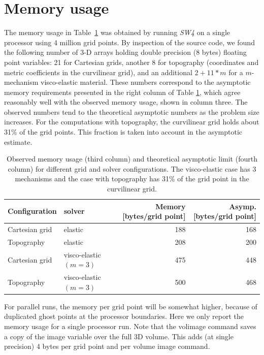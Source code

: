 \documentclass[11pt]{report}
\begin{document}
\section{Memory usage}

The memory usage in Table~\ref{tab:mem-usage} was obtained by running \emph{SW4} on a single processor
using 4 million grid points. By inspection of the source code, we found the following number of 3-D
arrays holding double precision (8 bytes) floating point variables:
21 for Cartesian grids, another
8 for topography (coordinates and metric coefficients in the curvilinear grid), and an additional
$2+11*m$ for a $m$-mechanism visco-elastic material. These numbers correspond to the asymptotic memory
 requirements presented in the right column of Table \ref{tab:mem-usage}, which agree reasonably well with the
 observed memory usage, shown in column three. The observed numbers tend to the theoretical asymptotic 
numbers as the problem size increases. For the computations with topography, the curvilinear grid holds about 31\%
of the grid points. This fraction is taken into account in the asymptotic estimate.
 \begin{table}
 \begin{center}
 \begin{tabular}{|l|l|r|r|}\hline
 Configuration   &  solver       & Memory [bytes/grid point]  & Asymp. [bytes/grid point] \\ \hline\hline
 Cartesian grid  & elastic       & 188   & 168       \\ \hline
 Topography      & elastic       & 208   &  200      \\ \hline 
 Cartesian grid  & visco-elastic $(m=3)$ & 475 & 448 \\ \hline 
 Topography      & visco-elastic $(m=3)$ & 500 & 468 \\ \hline 
 \end{tabular}
 \end{center}
 \caption{Observed memory usage (third column) and theoretical asymptotic limit (fourth column) for different 
   grid and solver configurations. The visco-elastic case has 3 mechanisms and the case with topography 
   has 31\% of the grid point in the curvilinear grid.}\label{tab:mem-usage}
 \end{table}

For parallel runs, the memory per grid point will be somewhat higher, because of duplicated 
ghost points at the processor boundaries. Here we only report the memory usage for a single processor run. 
Note that the volimage command saves a copy of the image variable over the full 3D volume. This adds (at single
precision) 4 bytes per grid point and per volume image command. 



 

\printindex
\end{document}
